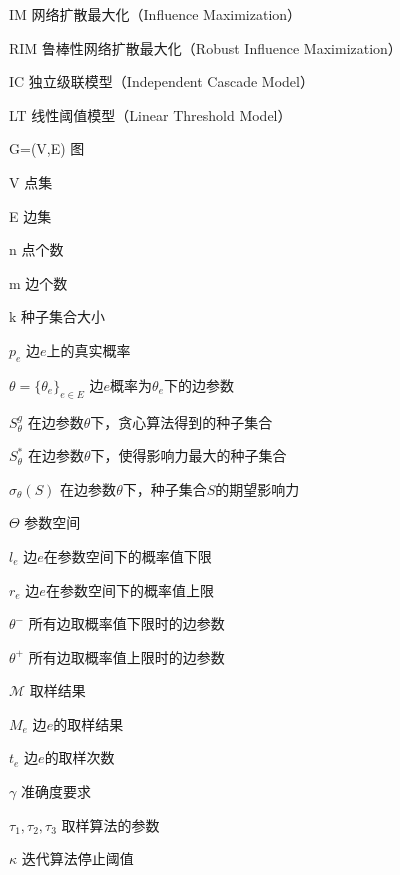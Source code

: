 
\begin{denotation}

\item[IM] 网络扩散最大化（Influence Maximization）
\item[RIM] 鲁棒性网络扩散最大化（Robust Influence Maximization）
\item[IC] 独立级联模型（Independent Cascade Model）
\item[LT] 线性阈值模型（Linear Threshold Model）
\item[G=(V,E)] 图
\item[V]	点集
\item[E]	边集
\item[n]	点个数
\item[m]	边个数
\item[k]	种子集合大小
\item[$p_e$]	边$e$上的真实概率
\item[$\theta=\{\theta_e\}_{e\in E}$] 边$e$概率为$\theta_e$下的边参数   
\item[$S_{\theta}^g$]  	在边参数$\theta$下，贪心算法得到的种子集合
\item[$S_{\theta}^*$] 在边参数$\theta$下，使得影响力最大的种子集合
\item[$\sigma_{\theta}(S)$] 在边参数$\theta$下，种子集合$S$的期望影响力
\item[$\Theta$] 参数空间
\item[$l_e$]    边$e$在参数空间下的概率值下限 
\item[$r_e$] 边$e$在参数空间下的概率值上限 
\item[$\theta^-$] 所有边取概率值下限时的边参数
\item[$\theta^+$] 所有边取概率值上限时的边参数
\item[$\mathcal{M}$] 取样结果
\item[$M_e$]    边$e$的取样结果
\item[$t_e$]    边$e$的取样次数
\item[$\gamma$] 准确度要求
\item[$\tau_1,\tau_2,\tau_3$]   取样算法的参数
\item[$\kappa$] 迭代算法停止阈值
\end{denotation}
